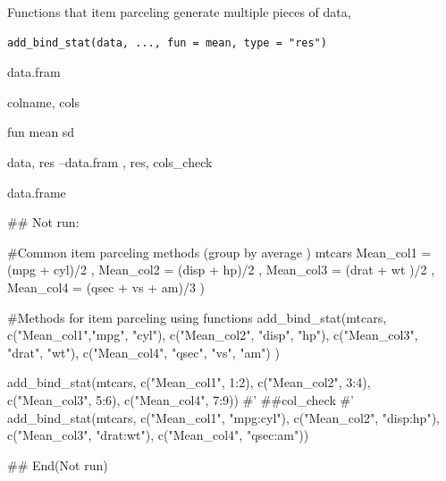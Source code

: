 \documentclass[a4paper]{book}
\begin{document}
%
\begin{Description}
Functions that item parceling generate multiple pieces of data,
\end{Description}
%
\begin{Usage}
\begin{verbatim}
add_bind_stat(data, ..., fun = mean, type = "res")
\end{verbatim}
\end{Usage}
%
\begin{Arguments}
\begin{ldescription}
\item[\code{data}] data.fram

\item[\code{...}] colname, cols

\item[\code{fun}] fun  mean sd

\item[\code{type}] data, res --data.fram , res, cols\_check
\end{ldescription}
\end{Arguments}
%
\begin{Value}
data.frame
\end{Value}
%
\begin{Examples}
\begin{ExampleCode}
\#\# Not run: 

#Common item parceling methods (group by average )
mtcars %
Mean_col1 = (mpg + cyl)/2 ,
Mean_col2 = (disp + hp)/2 ,
Mean_col3 = (drat + wt )/2 ,
Mean_col4 = (qsec + vs + am)/3 )

#Methods for item parceling using functions
add_bind_stat(mtcars,
c("Mean_col1","mpg", "cyl"),
c("Mean_col2", "disp", "hp"),
c("Mean_col3", "drat", "wt"),
c("Mean_col4", "qsec", "vs", "am") )



add_bind_stat(mtcars,
   c("Mean_col1", 1:2),
   c("Mean_col2", 3:4),
   c("Mean_col3", 5:6),
   c("Mean_col4", 7:9))
#'  ##col_check
#'
add_bind_stat(mtcars,
              c("Mean_col1", "mpg:cyl"),
              c("Mean_col2", "disp:hp"),
              c("Mean_col3", "drat:wt"),
              c("Mean_col4", "qsec:am"))

## End(Not run)

\end{ExampleCode}
\end{Examples}
\end{document}
